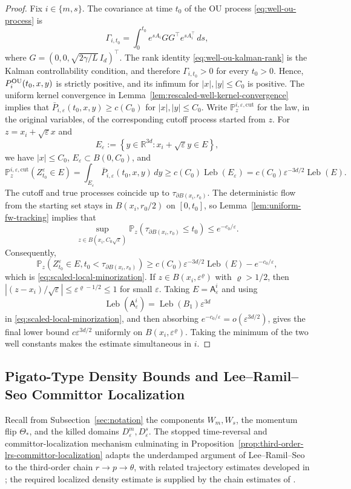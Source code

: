 \documentclass[11pt]{article}
\numberwithin{equation}{section}
\theoremstyle{plain}
\theoremstyle{definition}
\theoremstyle{remark}
\newcommand{\R}{\mathbb R}
\newcommand{\eps}{\varepsilon}
\newcommand{\Pbb}{\mathbb P}
\begin{document}
\begin{proof}
Fix $i\in\{m,s\}$.
The covariance at time $t_0$ of the OU process
\eqref{eq:well-ou-process} is
\[
\Gamma_{i,t_0}=\int_0^{t_0}e^{sA_i}GG^\top e^{sA_i^\top}\,ds,
\]
where $G=\left(0,0,\sqrt{2\gamma/L}\,I_d\right)^\top$.  The rank identity
\eqref{eq:well-ou-kalman-rank} is the Kalman controllability condition, and
therefore $\Gamma_{i,t_0}>0$ for every $t_0>0$.
Hence,
	$P_i^{\rm OU}(t_0,x,y)$ is strictly positive, and its infimum for
	$|x|,|y|\le C_0$ is positive.  The uniform kernel convergence in
	Lemma~\ref{lem:rescaled-well-kernel-convergence} implies that
	$\bar P_{i,\eps}(t_0,x,y)\ge c(C_0)$ for $|x|,|y|\le C_0$.  Write
	$\Pbb_z^{i,\eps,\mathrm{cut}}$ for the law, in the original variables, of
	the corresponding cutoff process started from $z$.  For
$z=x_i+\sqrt\eps x$ and
\[
E_\eps:=\left\{y\in\R^{3d}:x_i+\sqrt\eps y\in E\right\},
\]
we have $|x|\le C_0$, $E_\eps\subset B(0,C_0)$, and
\[
\Pbb_z^{i,\eps,\mathrm{cut}}(Z_{t_0}^\eps\in E)
=\int_{E_\eps}\bar P_{i,\eps}(t_0,x,y)\,dy
\ge c(C_0)\operatorname{Leb}(E_\eps)
=c(C_0)\eps^{-3d/2}\operatorname{Leb}(E).
\]
The cutoff and true processes coincide up to
$\tau_{\partial B(x_i,r_0)}$.  The deterministic flow from the starting set
stays in $B(x_i,r_0/2)$ on $[0,t_0]$, so
Lemma~\ref{lem:uniform-fw-tracking} implies that
\[
\sup_{z\in B(x_i,C_0\sqrt\eps)}
\Pbb_z\left(\tau_{\partial B(x_i,r_0)}\le t_0\right)
\le e^{-c_0/\eps}.
\]
Consequently,
\[
\Pbb_z\left(Z_{t_0}^\eps\in E,
t_0<\tau_{\partial B(x_i,r_0)}\right)
\ge
c(C_0)\eps^{-3d/2}\operatorname{Leb}(E)-e^{-c_0/\eps},
\]
which is \eqref{eq:scaled-local-minorization}.  If
$z\in B(x_i,\eps^\varrho)$ with $\varrho>1/2$, then
$|(z-x_i)/\sqrt\eps|\le\eps^{\varrho-1/2}\le1$ for small $\eps$.
Taking $E=\mathsf A_\eps^i$ and using
\[
\operatorname{Leb}(\mathsf A_\eps^i)=\operatorname{Leb}(B_1)\eps^{3d}
\]
in \eqref{eq:scaled-local-minorization}, and then absorbing
$e^{-c_0/\eps}=o(\eps^{3d/2})$, gives the final lower bound
$c\eps^{3d/2}$ uniformly on $B(x_i,\eps^\varrho)$.  Taking the minimum of the
two well constants makes the estimate simultaneous in $i$.
\end{proof}

\subsection{Pigato-Type Density Bounds and Lee--Ramil--Seo Committor Localization}
\label{app:pigato-lrs}

Recall from Subsection~\ref{sec:notation} the components $W_m,W_s$, the
momentum flip $\Theta_*$, and the killed domains $D_\eps^m,D_\eps^s$.
The stopped time-reversal and committor-localization mechanism culminating in
Proposition~\ref{prop:third-order-lrs-committor-localization} adapts
the underdamped argument of Lee--Ramil--Seo \cite{LeeRamilSeo2026} to the
third-order chain $r\to p\to\theta$, with related trajectory estimates developed
in \cite{LeeRamilSeo2023Cutoff}; the required localized density estimate is
supplied by the chain estimates of \cite{Pigato2022}.
\end{document}
